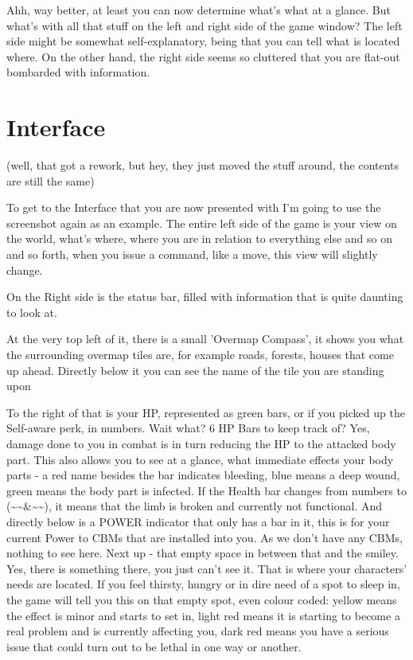 \documentclass[11pt]{report}
\begin{document}
Ahh, way better, at least you can now determine what's what at a glance. But what's with all that stuff on the left and right side of the game window? The left side might be somewhat self-explanatory, being that you can tell what is located where. On the other hand, the right side seems so cluttered that you are flat-out bombarded with information.

\section{Interface}

(well, that got a rework, but hey, they just moved the stuff around, the contents are still the same)

To get to the Interface that you are now presented with I'm going to use the screenshot again as an example.
The entire left side of the game is your view on the world, what's where, where you are in relation to everything else and so on and so forth, when you issue a command, like a move, this view will slightly change.

On the Right side is the status bar, filled with information that is quite daunting to look at.

At the very top left of it, there is a small 'Overmap Compass', it shows you what the surrounding overmap tiles are, for example roads, forests, houses that come up ahead. Directly below it you can see the name of the tile you are standing upon

To the right of that is your HP, represented as green bars, or if you picked up the Self-aware perk, in numbers.
Wait what? 6 HP Bars to keep track of? Yes, damage done to you in combat is in turn reducing the HP to the attacked body part. This also allows you to see at a glance, what immediate effects your body parts - a red name besides the bar indicates bleeding, blue means a deep wound, green means the body part is infected. If the Health bar changes from numbers to (\~{}\~{}\&\~{}\~{}), it means that the limb is broken and currently not functional.
And directly below is a POWER indicator that only has a bar in it, this is for your current Power to CBMs that are installed into you. As we don't have any CBMs, nothing to see here.
Next up - that empty space in between that and the smiley. Yes, there is something there, you just can't see it. That is where your characters' needs are located. If you feel thirsty, hungry or in dire need of a spot to sleep in, the game will tell you this on that empty spot, even colour coded: yellow means the effect is minor and starts to set in, light red means it is starting to become a real problem and is currently affecting you, dark red means you have a serious issue that could turn out to be lethal in one way or another.
\end{document}
